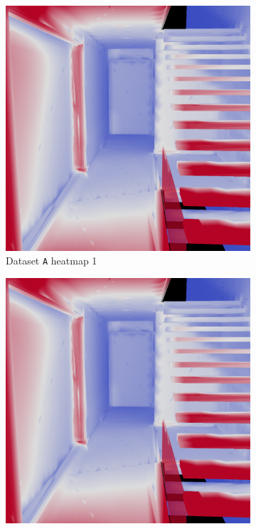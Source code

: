 \begin{figure}
	\centering
	\begin{subfigure}[t]{0.49\linewidth}
		\includegraphics[width=\textwidth]{chapters/chapter_results/correct2heatmap1}
		\caption{Dataset \texttt{A} heatmap 1}
	\end{subfigure}
	\begin{subfigure}[t]{0.49\linewidth}
		\includegraphics[width=\textwidth]{chapters/chapter_results/wrong2heatmap1}

\end{subfigure}
\end{figure}
